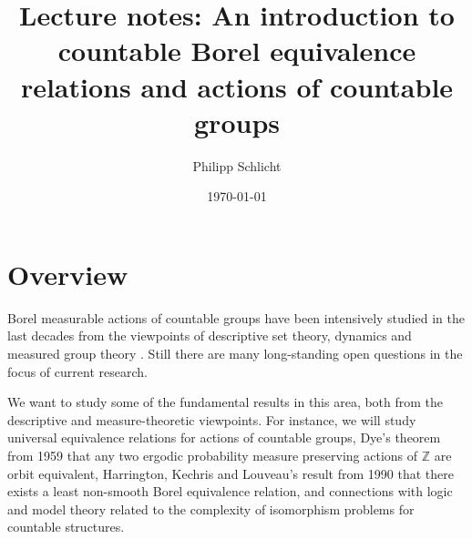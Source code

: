\documentclass[10pt]{amsart}
\newcommand{\ZZ}{\mathbb{Z}}
\theoremstyle{definition}
\theoremstyle{remark}
\begin{document}




\author{Philipp Schlicht}
\address{Philipp Schlicht, School of Mathematics, University of Bristol, Fry Building, Woodland Road, Bristol, BS8 1UG, UK}
\urladdr{}

\date{\today}


\title[Lecture notes: Countable Borel equivalence relations]{Lecture notes: An introduction to countable Borel equivalence relations and actions of countable groups}


\maketitle


\setcounter{tocdepth}{2}








\section{Overview} 

Borel measurable actions of countable groups have been intensively studied in the last decades from the viewpoints of descriptive set theory, dynamics and measured group theory \cite{MR2827853, MR2711968, MR3612001, MR3359054, MR2583950, KechrisShinko2019, Ioana2019}. 
Still there are many long-standing open questions in the focus of current research. 

We want to study some of the fundamental results in this area, both from the descriptive and measure-theoretic viewpoints. 
For instance, we will study universal equivalence relations for actions of countable groups, Dye's theorem from 1959 that any two ergodic probability measure preserving actions of $\ZZ$ are orbit equivalent, Harrington, Kechris and Louveau's result from 1990 that there exists a least non-smooth Borel equivalence relation, and connections with logic and model theory related to the complexity of isomorphism problems for countable structures. 
 
\end{document}
